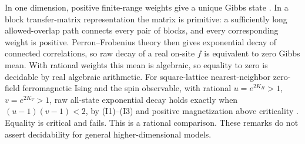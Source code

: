 \begin{remark}
In one dimension, positive finite-range weights give a unique Gibbs state \cite[Corollary 6.41]{FV}. In a block transfer-matrix representation the matrix is primitive: a sufficiently long allowed-overlap path connects every pair of blocks, and every corresponding weight is positive. Perron--Frobenius theory then gives exponential decay of connected correlations, so raw decay of a real on-site $f$ is equivalent to zero Gibbs mean. With rational weights this mean is algebraic, so equality to zero is decidable by real algebraic arithmetic. For square-lattice nearest-neighbor zero-field ferromagnetic Ising and the spin observable, with rational $u=e^{2K_H}>1$, $v=e^{2K_V}>1$, raw all-state exponential decay holds exactly when $(u-1)(v-1)<2$, by (I1)--(I3) and positive magnetization above criticality \cite{CDC,DCT}. Equality is critical and fails. This is a rational comparison. These remarks do not assert decidability for general higher-dimensional models.
\end{remark}
